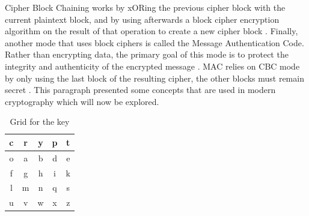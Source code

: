 \documentclass{l4proj}
\begin{document}
Cipher Block Chaining works by xORing the previous cipher block with the current plaintext block, and by using afterwards a block cipher encryption algorithm
on the result of that operation to create a new cipher block \citep{savage_cse_2019} \citep{kessler_overview_2016}. 
Finally, another mode that uses block ciphers is called the Message Authentication Code. Rather than encrypting data, the primary goal of this mode is to protect the integrity
and authenticity of the encrypted message \citep{anderson_security_2008}. MAC relies on CBC mode by only using the last block of the resulting cipher, 
the other blocks must remain secret \citep{anderson_security_2008}. 
This paragraph presented some concepts that are used in modern cryptography which will now be explored.

    \begin{table}[]
    \centering
    \begin{tabular}{|c|c|c|c|c|}
        \hline
        c & r & y & p & t \\
        \hline
        o & a & b & d & e \\
        \hline
        f & g & h & i & k \\
        \hline
        l & m & n & q & s \\
        \hline
        u & v & w & x & z \\
        \hline
    \end{tabular}
    \caption{Grid for the key}\label{tab:key}
    \end{table}
\end{document}
